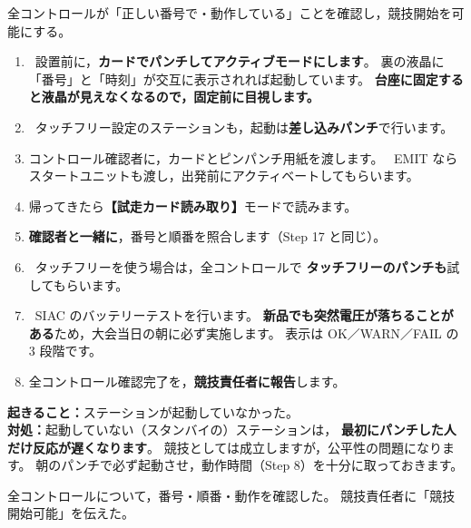 
\begin{Goal}
全コントロールが「正しい番号で・動作している」ことを確認し，競技開始を可能にする。
\end{Goal}

\begin{enumerate}
\item \tSI\ 設置前に，\textbf{カードでパンチしてアクティブモードにします}。
      裏の液晶に「番号」と「時刻」が交互に表示されれば起動しています。
      \textbf{台座に固定すると液晶が見えなくなるので，固定前に目視します。}
\item \tSIAC\ タッチフリー設定のステーションも，起動は\textbf{差し込みパンチ}で行います。
\item コントロール確認者に，カードとピンパンチ用紙を渡します。
      \tEMIT\ EMIT ならスタートユニットも渡し，出発前にアクティベートしてもらいます。
\item 帰ってきたら\textbf{【試走カード読み取り】}モードで読みます。
\item \textbf{確認者と一緒に}，番号と順番を照合します（Step 17 と同じ）。
\item \tSIAC\ タッチフリーを使う場合は，全コントロールで
      \textbf{タッチフリーのパンチも}試してもらいます。
\item \tSIAC\ SIAC のバッテリーテストを行います。
      \textbf{新品でも突然電圧が落ちることがある}ため，大会当日の朝に必ず実施します。
      表示は OK／WARN／FAIL の 3 段階です。
\item 全コントロール確認完了を，\textbf{競技責任者に報告}します。
\end{enumerate}

\begin{Fail}
\textbf{起きること：}ステーションが起動していなかった。\\
\textbf{対処：}起動していない（スタンバイの）ステーションは，
\textbf{最初にパンチした人だけ反応が遅くなります}。
競技としては成立しますが，公平性の問題になります。
朝のパンチで必ず起動させ，動作時間（Step 8）を十分に取っておきます。
\end{Fail}

\begin{Done}
全コントロールについて，番号・順番・動作を確認した。
競技責任者に「競技開始可能」を伝えた。
\end{Done}


